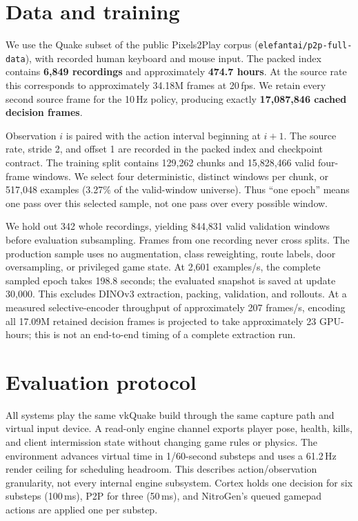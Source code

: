\documentclass[11pt]{article}
\begin{document}
\section{Data and training}\label{sec:data}

We use the Quake subset of the public Pixels2Play corpus (\texttt{elefantai/p2p-full-data}), with recorded human keyboard and mouse input. The packed index contains \textbf{6{,}849 recordings} and approximately \textbf{474.7 hours}. At the source rate this corresponds to approximately 34.18M frames at 20\,fps. We retain every second source frame for the 10\,Hz policy, producing exactly \textbf{17{,}087{,}846 cached decision frames}.

Observation $i$ is paired with the action interval beginning at $i+1$. The source rate, stride 2, and offset 1 are recorded in the packed index and checkpoint contract. The training split contains 129{,}262 chunks and 15{,}828{,}466 valid four-frame windows. We select four deterministic, distinct windows per chunk, or 517{,}048 examples (3.27\% of the valid-window universe). Thus ``one epoch'' means one pass over this selected sample, not one pass over every possible window.

We hold out 342 whole recordings, yielding 844{,}831 valid validation windows before evaluation subsampling. Frames from one recording never cross splits. The production sample uses no augmentation, class reweighting, route labels, door oversampling, or privileged game state. At 2{,}601 examples/s, the complete sampled epoch takes 198.8 seconds; the evaluated snapshot is saved at update 30{,}000. This excludes DINOv3 extraction, packing, validation, and rollouts. At a measured selective-encoder throughput of approximately 207 frames/s, encoding all 17.09M retained decision frames is projected to take approximately 23 GPU-hours; this is not an end-to-end timing of a complete extraction run.

\section{Evaluation protocol}\label{sec:protocol}

All systems play the same vkQuake build through the same capture path and virtual input device. A read-only engine channel exports player pose, health, kills, and client intermission state without changing game rules or physics. The environment advances virtual time in 1/60-second substeps and uses a 61.2\,Hz render ceiling for scheduling headroom. This describes action/observation granularity, not every internal engine subsystem. Cortex holds one decision for six substeps (100\,ms), P2P for three (50\,ms), and NitroGen's queued gamepad actions are applied one per substep.
\end{document}
